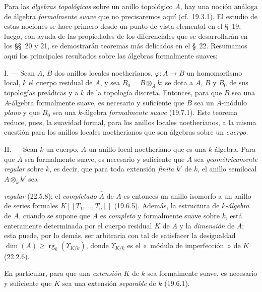 \begin{env}[19.0.2]
\label{0.19.0.2-fr}
Para las \emph{álgebras topológicas} sobre un anillo topológico $A$, hay una
noción análoga de álgebra \emph{formalmente suave} que no precisaremos
aquí (cf.~19.3.1). El estudio de estas nociones se hace primero desde un punto de vista
elemental en el §~19; luego, con ayuda de las propiedades de los diferenciales que
se desarrollarán en los §§~20 y 21, se demostrarán teoremas más delicados
en el §~22. Resumamos aquí los principales resultados sobre las álgebras formalmente
suaves:

\medskip\noindent I. --- Sean $A$, $B$ dos anillos locales
noetherianos, $\varphi:A\to B$ un homomorfismo local, $k$ el cuerpo residual de
$A$, y sea $B_0=B\otimes_A k$; se dota a $A$, $B$ y $B_0$ de sus
topologías preádicas y a $k$ de la topología discreta. Entonces, para que $B$ sea
una $A$-álgebra formalmente suave, es necesario y suficiente que $B$ sea un
$A$-módulo \emph{plano} y que $B_0$ sea una $k$-álgebra \emph{formalmente
suave} (19.7.1). Este teorema reduce, pues, la suavidad formal, para los anillos
locales noetherianos, a la misma cuestión para los anillos locales noetherianos que
son álgebras sobre un \emph{cuerpo}.

\medskip\noindent II. --- Sean $k$ un cuerpo, $A$ un anillo local
noetheriano que es una $k$-álgebra. Para que $A$ sea formalmente suave, es
necesario y suficiente que $A$ sea \emph{geométricamente regular} sobre $k$,
es decir, que para toda extensión \emph{finita} $k'$ de $k$, el anillo
semilocal $A\otimes_k k'$ sea


\noindent \emph{regular} (22.5.8); el \emph{completado} $\widehat A$ de $A$ es entonces
un anillo isomorfo a un anillo de series formales
$K[[T_1,\ldots,T_n]]$ (19.6.5). Además, la estructura de \emph{$k$-álgebra} de $A$,
cuando se supone que $A$ es \emph{completo} y formalmente suave sobre $k$, está
enteramente determinada por el cuerpo residual $K$ de $A$ y la \emph{dimensión}
de $A$; esta puede, por lo demás, ser arbitraria con tal de satisfacer la
desigualdad
$\dim(A)\geq \operatorname{rg}_k(\Upsilon_{K/k})$,
donde $\Upsilon_{K/k}$ es el «~módulo de imperfección~» de $K$ (22.2.6).

En particular, para que una \emph{extensión} $K$ de $k$ sea formalmente
suave, es necesario y suficiente que $K$ sea una extensión \emph{separable} de $k$
(19.6.1).


\end{env}
